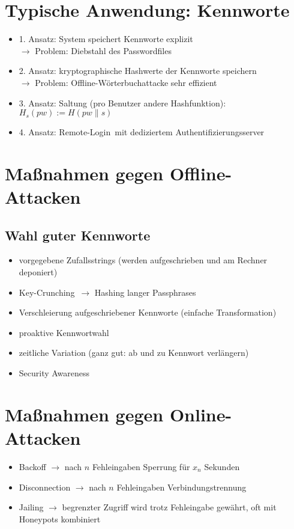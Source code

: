 \documentclass[a4paper,twoside,DIV15,BCOR12mm]{scrbook}
\begin{document}
\section{Typische Anwendung: Kennworte}

\begin{itemize}
	\item 1. Ansatz: System speichert Kennworte explizit\\ $\rightarrow$ Problem: Diebstahl des Passwordfiles
	\item 2. Ansatz: kryptographische Hashwerte der Kennworte speichern\\ $\rightarrow$ Problem: Offline-Wörterbuchattacke sehr effizient
	\item 3. Ansatz: Saltung (pro Benutzer andere Hashfunktion): $H_s(pw) := H(pw \| s)$
	\item 4. Ansatz: \glqq Remote-Login\grqq\ mit dediziertem Authentifizierungsserver
\end{itemize}

\section{Maßnahmen gegen Offline-Attacken}

\subsection{Wahl guter Kennworte}

\begin{itemize}
	\item vorgegebene Zufallsstrings (werden aufgeschrieben und am Rechner deponiert)
	\item \glqq Key-Crunching\grqq\ $\rightarrow$ Hashing langer Passphrases
	\item Verschleierung aufgeschriebener Kennworte (einfache Transformation)
	\item proaktive Kennwortwahl
	\item zeitliche Variation (ganz gut: ab und zu Kennwort verlängern)
	\item Security Awareness
\end{itemize}

\section{Maßnahmen gegen Online-Attacken}

\begin{itemize}
	\item Backoff $\rightarrow$ nach $n$ Fehleingaben Sperrung für $x_n$ Sekunden
	\item Disconnection $\rightarrow$ nach $n$ Fehleingaben Verbindungstrennung
	\item Jailing $\rightarrow$ begrenzter Zugriff wird trotz Fehleingabe gewährt, oft mit Honeypots kombiniert
\end{itemize}
\end{document}
